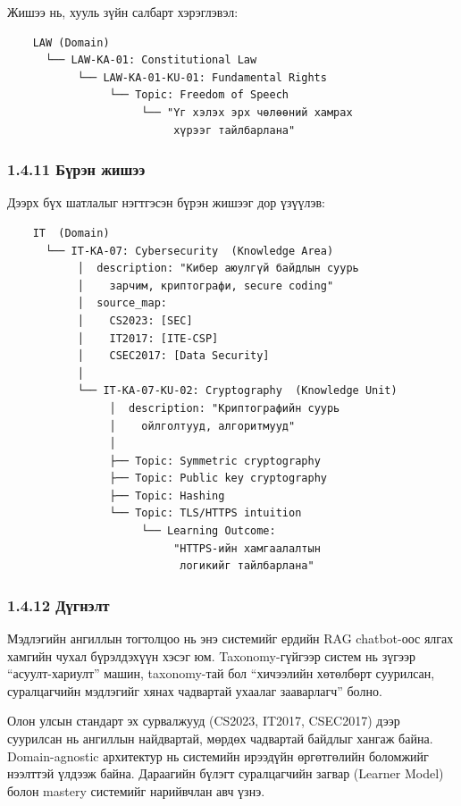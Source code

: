 \documentclass[12pt,A4]{report}
\newcommand{\eng}[1]{#1}
\begin{document}
Жишээ нь, хууль зүйн салбарт хэрэглэвэл:

\begin{verbatim}
    LAW (Domain)
      └── LAW-KA-01: Constitutional Law
           └── LAW-KA-01-KU-01: Fundamental Rights
                └── Topic: Freedom of Speech
                     └── "Үг хэлэх эрх чөлөөний хамрах
                          хүрээг тайлбарлана"
\end{verbatim}

\subsubsection{1.4.11 Бүрэн жишээ}

Дээрх бүх шатлалыг нэгтгэсэн бүрэн жишээг дор үзүүлэв:

\begin{verbatim}
    IT  (Domain)
      └── IT-KA-07: Cybersecurity  (Knowledge Area)
           │  description: "Кибер аюулгүй байдлын суурь
           │    зарчим, криптографи, secure coding"
           │  source_map:
           │    CS2023: [SEC]
           │    IT2017: [ITE-CSP]
           │    CSEC2017: [Data Security]
           │
           └── IT-KA-07-KU-02: Cryptography  (Knowledge Unit)
                │  description: "Криптографийн суурь
                │    ойлголтууд, алгоритмууд"
                │
                ├── Topic: Symmetric cryptography
                ├── Topic: Public key cryptography
                ├── Topic: Hashing
                └── Topic: TLS/HTTPS intuition
                     └── Learning Outcome:
                          "HTTPS-ийн хамгаалалтын
                           логикийг тайлбарлана"
\end{verbatim}

\subsubsection{1.4.12 Дүгнэлт}

Мэдлэгийн ангиллын тогтолцоо нь энэ системийг ердийн RAG \eng{chatbot}-оос ялгах хамгийн чухал бүрэлдэхүүн хэсэг юм. \eng{Taxonomy}-гүйгээр систем нь зүгээр ``асуулт-хариулт'' машин, \eng{taxonomy}-тай бол ``хичээлийн хөтөлбөрт суурилсан, суралцагчийн мэдлэгийг хянах чадвартай ухаалаг зааварлагч'' болно.

Олон улсын стандарт эх сурвалжууд (CS2023, IT2017, CSEC2017) дээр суурилсан нь ангиллын найдвартай, мөрдөх чадвартай байдлыг хангаж байна. \eng{Domain-agnostic} архитектур нь системийн ирээдүйн өргөтгөлийн боломжийг нээлттэй үлдээж байна. Дараагийн бүлэгт суралцагчийн загвар (\eng{Learner Model}) болон \eng{mastery} системийг нарийвчлан авч үзнэ.
\end{document}
